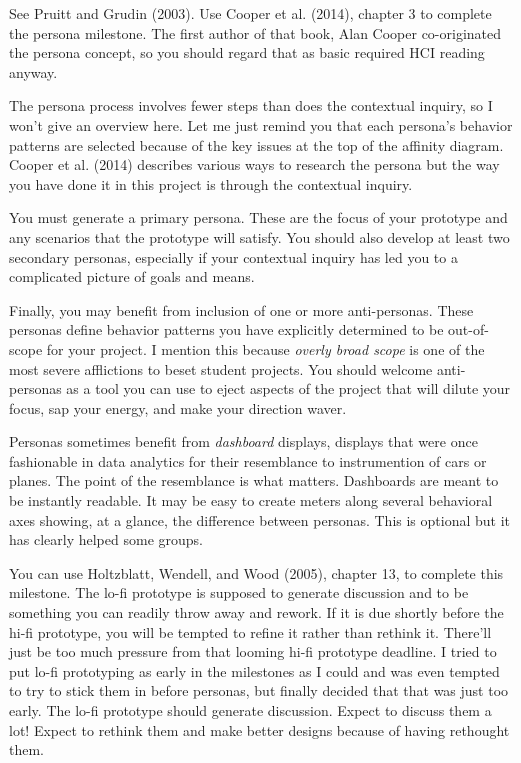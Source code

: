 \hypertarget{milestone-3.-personas}{%
\label{milestone-3.-personas}}

See Pruitt and Grudin (2003). Use Cooper et al. (2014), chapter 3 to
complete the persona milestone. The first author of that book, Alan
Cooper co-originated the persona concept, so you should regard that as
basic required HCI reading anyway.

The persona process involves fewer steps than does the contextual
inquiry, so I won't give an overview here. Let me just remind you that
each persona's behavior patterns are selected because of the key issues
at the top of the affinity diagram. Cooper et al. (2014) describes
various ways to research the persona but the way you have done it in
this project is through the contextual inquiry.

You must generate a primary persona. These are the focus of your
prototype and any scenarios that the prototype will satisfy. You should
also develop at least two secondary personas, especially if your
contextual inquiry has led you to a complicated picture of goals and
means.

Finally, you may benefit from inclusion of one or more anti-personas.
These personas define behavior patterns you have explicitly determined
to be out-of-scope for your project. I mention this because \emph{overly
broad scope} is one of the most severe afflictions to beset student
projects. You should welcome anti-personas as a tool you can use to
eject aspects of the project that will dilute your focus, sap your
energy, and make your direction waver.

Personas sometimes benefit from \emph{dashboard} displays, displays that
were once fashionable in data analytics for their resemblance to
instrumention of cars or planes. The point of the resemblance is what
matters. Dashboards are meant to be instantly readable. It may be easy
to create meters along several behavioral axes showing, at a glance, the
difference between personas. This is optional but it has clearly helped
some groups.

\hypertarget{milestone-4.-lo-fi-prototype}{%
\label{milestone-4.-lo-fi-prototype}}

You can use Holtzblatt, Wendell, and Wood (2005), chapter 13, to
complete this milestone. The lo-fi prototype is supposed to generate
discussion and to be something you can readily throw away and rework. If
it is due shortly before the hi-fi prototype, you will be tempted to
refine it rather than rethink it. There'll just be too much pressure
from that looming hi-fi prototype deadline. I tried to put lo-fi
prototyping as early in the milestones as I could and was even tempted
to try to stick them in before personas, but finally decided that that
was just too early. The lo-fi prototype should generate discussion.
Expect to discuss them a lot! Expect to rethink them and make better
designs because of having rethought them.

